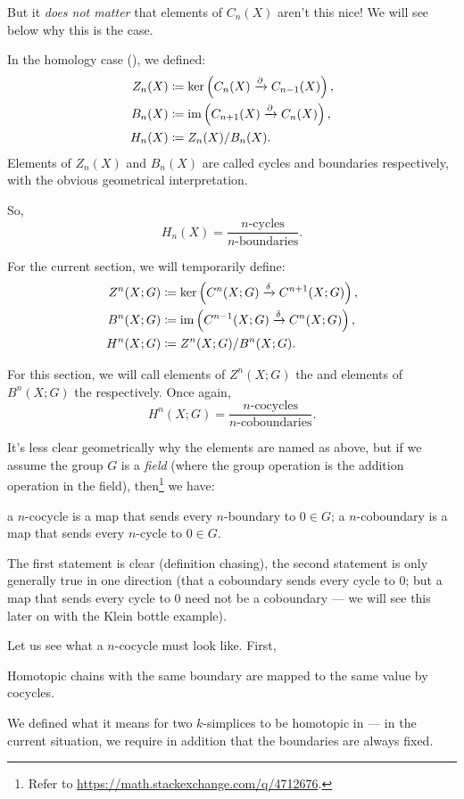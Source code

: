 But it \emph{does not matter} that elements of $C_n(X)$ aren't this nice!
We will see below why this is the case.

In the homology case (), we defined:
\begin{align*}
	Z_n(X) &\coloneqq \ker\left( C_{n}(X) \xrightarrow{\partial} C_{n-1}(X) \right), \\
	B_n(X) &\coloneqq \operatorname{im} \left( C_{n+1}(X) \xrightarrow{\partial} C_n(X) \right), \\
	H_n(X) &\coloneqq Z_n(X)/B_n(X).
\end{align*}
Elements of $Z_n(X)$ and $B_n(X)$ are called cycles and boundaries respectively,
with the obvious geometrical interpretation.

So,
\[
	H_n(X) = \frac{\text{$n$-cycles}}{\text{$n$-boundaries}}.
\]

For the current section, we will temporarily define:
\begin{align*}
	Z^n(X; G) &\coloneqq \ker\left( C^n(X; G) \xrightarrow{\delta} C^{n+1}(X; G) \right), \\
	B^n(X; G) &\coloneqq \operatorname{im}\left( C^{n-1}(X; G) \xrightarrow{\delta} C^n(X; G) \right), \\
	H^n(X; G) &\coloneqq Z^n(X; G)/B^n(X; G).
\end{align*}

For this section, we will call elements of $Z^n(X; G)$ the 
and elements of $B^n(X; G)$ the  respectively.
Once again,
\[ H^n(X; G) = \frac{\text{$n$-cocycles}}{\text{$n$-coboundaries}}. \]

It's less clear geometrically why the elements are named as above, but
if we assume the group $G$ is a \emph{field} (where the group operation is the addition
operation in the field), then\footnote{Refer to
\url{https://math.stackexchange.com/q/4712676}.} we have:
\begin{itemize}
	\ii a $n$-cocycle is a map that sends every $n$-boundary to $0 \in G$;
	\ii a $n$-coboundary is a map that sends every $n$-cycle to $0 \in G$.
\end{itemize}

The first statement is clear (definition chasing), the second statement is only generally true in
one direction (that a coboundary sends every cycle to $0$; but a map that sends every cycle to $0$
need not be a coboundary --- we will see this later on with the Klein bottle example).

Let us see what a $n$-cocycle must look like. First,
\begin{moral}
	Homotopic chains with the same boundary are mapped to the same value by cocycles.
\end{moral}
We defined what it means for two $k$-simplices to be homotopic in 
--- in the current situation, we require in addition that the boundaries are always fixed.

